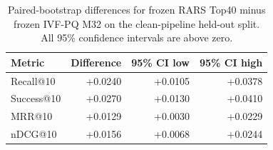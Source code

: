 \begin{table}[t]
\centering
\caption{Paired-bootstrap differences for frozen RARS Top40 minus frozen IVF-PQ M32 on the clean-pipeline held-out split. All 95\% confidence intervals are above zero.}
\label{tab:clean-rars-significance}
\begin{tabular}{lrrr}
\toprule
Metric & Difference & 95\% CI low & 95\% CI high \\
\midrule
Recall@10 & +0.0240 & +0.0105 & +0.0378 \\
Success@10 & +0.0270 & +0.0130 & +0.0410 \\
MRR@10 & +0.0129 & +0.0030 & +0.0229 \\
nDCG@10 & +0.0156 & +0.0068 & +0.0244 \\
\bottomrule
\end{tabular}
\end{table}
